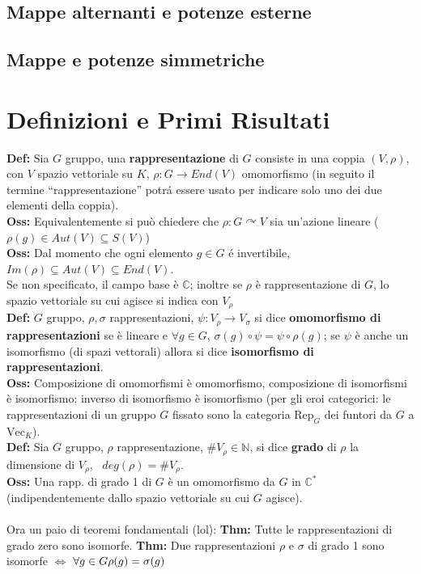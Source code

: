\documentclass[a4paper,11pt]{article}
\newcommand{\NN}{\mathbb{N}}
\newcommand{\CC}{\mathbb{C}}
\newcommand{\acts}{\curvearrowright}
\newcommand{\function}[3]{#1:#2 \rightarrow #3}
\newcommand{\thm}{\vskip 0.05cm \noindent \textbf{Thm:} }
\newcommand{\definition}{\vskip 0.05cm \noindent \textbf{Def:} }
\newcommand{\oss}{\vskip 0.05cm \noindent \textbf{Oss:} }
\newcommand{\sse}{\Leftrightarrow}
\begin{document}
\subsection{Mappe alternanti e potenze esterne}


\subsection{Mappe e potenze simmetriche}

\newpage
\section{Definizioni e Primi Risultati}
\definition Sia $G$ gruppo, una {\bf rappresentazione} di $G$ consiste in una coppia $(V,\rho)$, con $V$ spazio vettoriale su $K$, $\function{\rho}{G}{End(V)}$ omomorfismo (in seguito il termine ``rappresentazione'' potr\'a essere usato per indicare solo uno dei due elementi della coppia).
\\
\oss Equivalentemente si pu\`o chiedere che $\rho:G\acts V$ sia un'azione lineare ($\rho(g) \in Aut(V) \subseteq S(V)$)
\\
\oss Dal momento che ogni elemento $g\in G$ \'e invertibile, \\ $Im(\rho)\subseteq Aut(V) \subseteq End(V)$. \\
Se non specificato, il campo base \`e $\CC$; inoltre se $\rho$ \`e rappresentazione di $G$, lo spazio vettoriale su cui agisce si indica con $V_{\rho}$
\\
\definition $G$ gruppo, $\rho, \sigma$ rappresentazioni,  $\function{\psi}{V_{\rho}}{V_{\sigma}}$ si dice {\bf omomorfismo di rappresentazioni} se \`e lineare e $\forall g \in G$, $\sigma (g) \circ \psi = \psi \circ \rho (g)$; se $\psi$ \`e anche un isomorfismo (di spazi vettorali) allora si dice {\bf isomorfismo di rappresentazioni}.
\\
\oss Composizione di omomorfismi \`e omomorfismo, composizione di isomorfismi \`e isomorfismo; inverso di isomorfismo \`e isomorfismo (per gli eroi categorici: le rappresentazioni di un gruppo $G$ fissato sono la categoria $\mbox{Rep}_{G}$ dei funtori da $G$ a $\mbox{Vec}_{K}$).\\
\definition Sia $G$ gruppo, $\rho$ rappresentazione, $\# V_{\rho} \in \NN$, si dice {\bf grado} di $ \rho$ la dimensione di $V_{\rho}$, \ $deg(\rho)=\# V_{\rho}$.\\

\oss Una rapp. di grado 1 di $G$ \`e un omomorfismo da $G$ in $\CC^{*}$ (indipendentemente dallo spazio vettoriale su cui $G$ agisce).\\
\\
Ora un paio di teoremi fondamentali (lol):
\thm Tutte le rappresentazioni di grado zero sono isomorfe.
\thm Due rappresentazioni $\rho$ e $\sigma$ di grado 1 sono isomorfe $\sse$ $\forall g\in G  \\ \rho(g)=\sigma(g)$ 
\end{document}
